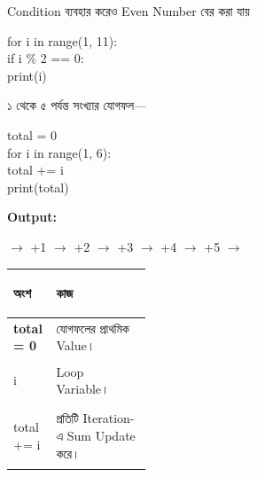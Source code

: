 
\begin{examplebox}{Condition ব্যবহার করেও Even Number বের করা যায়}

\begin{codebox}
\begin{english}
\ttfamily
for i in range(1, 11):\\
\hspace*{4mm}if i \% 2 == 0:\\
\hspace*{8mm}print(i)
\end{english}
\end{codebox}

\end{examplebox}



১ থেকে ৫ পর্যন্ত সংখ্যার যোগফল—

\begin{codebox}
\begin{english}
\ttfamily
total = 0\\[0.5mm]
for i in range(1, 6):\\
\hspace*{4mm}total += i\\[0.5mm]
print(total)
\end{english}
\end{codebox}

\textbf{Output:}
\textenglish{}

\begin{center}

\textenglish{}
\(\longrightarrow\)
\textenglish{\ttfamily +1}
\(\longrightarrow\)
\textenglish{\ttfamily +2}
\(\longrightarrow\)
\textenglish{\ttfamily +3}
\(\longrightarrow\)
\textenglish{\ttfamily +4}
\(\longrightarrow\)
\textenglish{\ttfamily +5}
\(\longrightarrow\)
\textenglish{}

\end{center}

\begin{tabularx}
{\linewidth}
{
|>{\bfseries\RaggedRight\arraybackslash}p{0.31\linewidth}
|Y|
}

\hline
{}

\textbf{অংশ}
&
\textbf{কাজ}
\\
\hline

\textenglish{\ttfamily total = 0}
&
যোগফলের প্রাথমিক Value।
\\
\hline

\textenglish{\ttfamily i}
&
Loop Variable।
\\
\hline

\textenglish{\ttfamily total += i}
&
প্রতিটি Iteration-এ Sum Update করে।
\\
\hline

\end{tabularx}

